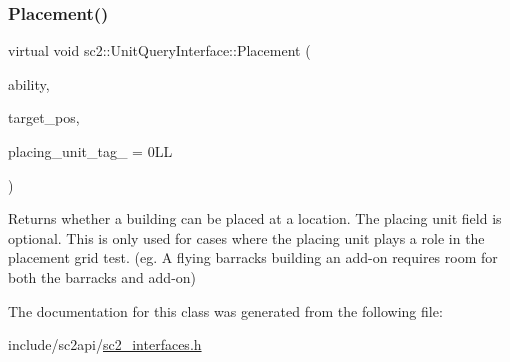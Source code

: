 \subsubsection{\texorpdfstring{Placement()}{Placement()}}
{\footnotesize\ttfamily virtual void sc2\+::\+Unit\+Query\+Interface\+::\+Placement (\begin{DoxyParamCaption}\item[{const \hyperlink{classsc2_1_1_s_c2_type}{Ability\+ID} \&}]{ability,  }\item[{const \hyperlink{structsc2_1_1_point2_d}{Point2D} \&}]{target\+\_\+pos,  }\item[{uint64\+\_\+t}]{placing\+\_\+unit\+\_\+tag\+\_\+ = {\ttfamily 0LL} }\end{DoxyParamCaption})\hspace{0.3cm}{\ttfamily [pure virtual]}}

Returns whether a building can be placed at a location. The placing unit field is optional. This is only used for cases where the placing unit plays a role in the placement grid test. (eg. A flying barracks building an add-\/on requires room for both the barracks and add-\/on) 

The documentation for this class was generated from the following file\+:\begin{DoxyCompactItemize}
\item 
include/sc2api/\hyperlink{sc2__interfaces_8h}{sc2\+\_\+interfaces.\+h}\end{DoxyCompactItemize}
